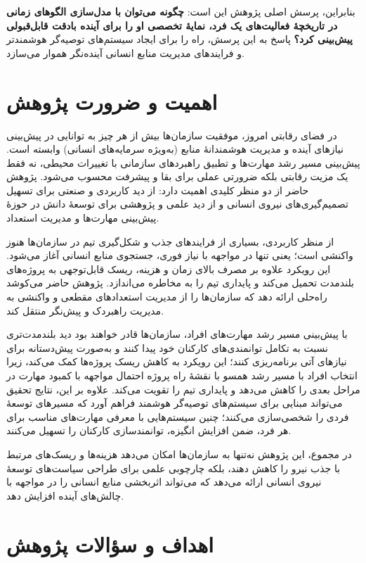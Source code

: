 بنابراین، پرسش اصلی پژوهش این است:
\textbf{چگونه می‌توان با مدل‌سازی الگوهای زمانی در تاریخچهٔ فعالیت‌های یک فرد، نمایهٔ تخصصی او را برای آینده بادقت قابل‌قبولی پیش‌بینی کرد؟}
پاسخ به این پرسش، راه را برای ایجاد سیستم‌های توصیه‌گر هوشمندتر و فرایندهای مدیریت منابع انسانی آینده‌نگر هموار می‌سازد.

\section{اهمیت و ضرورت پژوهش}

در فضای رقابتی امروز، موفقیت سازمان‌ها بیش از هر چیز به توانایی در پیش‌بینی نیازهای آینده و مدیریت هوشمندانهٔ منابع (به‌ویژه سرمایه‌های انسانی) وابسته است. پیش‌بینی مسیر رشد مهارت‌ها و تطبیق راهبردهای سازمانی با تغییرات محیطی، نه فقط یک مزیت رقابتی بلکه ضرورتی عملی برای بقا و پیشرفت محسوب می‌شود. پژوهش حاضر از دو منظر کلیدی اهمیت دارد: از دید کاربردی و صنعتی برای تسهیل تصمیم‌گیری‌های نیروی انسانی و از دید علمی و پژوهشی برای توسعهٔ دانش در حوزهٔ پیش‌بینی مهارت‌ها و مدیریت استعداد.

از منظر کاربردی، بسیاری از فرایندهای جذب و شکل‌گیری تیم در سازمان‌ها هنوز واکنشی است؛ یعنی تنها در مواجهه با نیاز فوری، جستجوی منابع انسانی آغاز می‌شود. این رویکرد علاوه بر مصرف بالای زمان و هزینه، ریسک قابل‌توجهی به پروژه‌های بلندمدت تحمیل می‌کند و پایداری تیم را به مخاطره می‌اندازد. پژوهش حاضر می‌کوشد راه‌حلی ارائه دهد که سازمان‌ها را از مدیریت استعدادهای مقطعی و واکنشی به مدیریت راهبردک و پیش‌نگر منتقل کند.

با پیش‌بینی مسیر رشد مهارت‌های افراد، سازمان‌ها قادر خواهند بود دید بلندمدت‌تری نسبت به تکامل توانمندی‌های کارکنان خود پیدا کنند و به‌صورت پیش‌دستانه برای نیازهای آتی برنامه‌ریزی کنند؛ این رویکرد به کاهش ریسک پروژه‌ها کمک می‌کند، زیرا انتخاب افراد با مسیر رشد همسو با نقشهٔ راه پروژه احتمال مواجهه با کمبود مهارت در مراحل بعدی را کاهش می‌دهد و پایداری تیم را تقویت می‌کند. علاوه بر این، نتایج تحقیق می‌تواند مبنایی برای سیستم‌های توصیه‌گر هوشمند فراهم آورد که مسیرهای توسعهٔ فردی را شخصی‌سازی می‌کنند؛ چنین سیستم‌هایی با معرفی مهارت‌های مناسب برای هر فرد، ضمن افزایش انگیزه، توانمندسازی کارکنان را تسهیل می‌کنند.

در مجموع، این پژوهش نه‌تنها به سازمان‌ها امکان می‌دهد هزینه‌ها و ریسک‌های مرتبط با جذب نیرو را کاهش دهند، بلکه چارچوبی علمی برای طراحی سیاست‌های توسعهٔ نیروی انسانی ارائه می‌دهد که می‌تواند اثربخشی منابع انسانی را در مواجهه با چالش‌های آینده افزایش دهد.


\section{اهداف و سؤالات پژوهش}  


